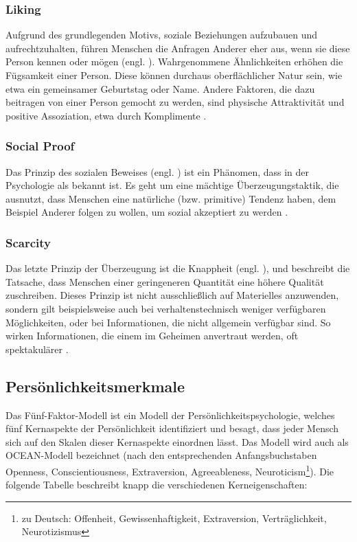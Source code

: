 \subsubsection{Liking}
Aufgrund des grundlegenden Motivs, soziale Beziehungen aufzubauen und aufrechtzuhalten, führen Menschen die Anfragen Anderer eher aus, wenn sie diese Person kennen oder mögen (engl. ).
Wahrgenommene Ähnlichkeiten erhöhen die Fügsamkeit einer Person. Diese können durchaus oberflächlicher Natur sein, wie etwa ein gemeinsamer Geburtstag oder Name.
Andere Faktoren, die dazu beitragen von einer Person gemocht zu werden, sind physische Attraktivität und positive Assoziation, etwa durch Komplimente .

\subsubsection{Social Proof}
Das Prinzip des sozialen Beweises (engl. ) ist ein Phänomen, dass in der Psychologie als  bekannt ist.
Es geht um eine mächtige Überzeugungstaktik, die ausnutzt, dass Menschen eine natürliche (bzw. primitive) Tendenz haben, dem Beispiel Anderer folgen zu wollen, um sozial akzeptiert zu werden .

\subsubsection{Scarcity}
Das letzte Prinzip der Überzeugung ist die Knappheit (engl. ), und beschreibt die Tatsache, dass Menschen einer geringeneren Quantität eine höhere Qualität zuschreiben.
Dieses Prinzip ist nicht ausschließlich auf Materielles anzuwenden, sondern gilt beispielsweise auch bei verhaltenstechnisch weniger verfügbaren Möglichkeiten, oder bei Informationen, die nicht allgemein verfügbar sind.
So wirken Informationen, die einem im Geheimen anvertraut werden, oft spektakulärer .

\subsection{Persönlichkeitsmerkmale}

Das Fünf-Faktor-Modell ist ein Modell der Persönlichkeitspsychologie, welches fünf Kernaspekte der Persönlichkeit identifiziert und besagt, dass jeder Mensch sich auf den Skalen dieser Kernaspekte einordnen lässt.
Das Modell wird auch als OCEAN-Modell bezeichnet (nach den entsprechenden Anfangsbuchstaben Openness, Conscientiousness, Extraversion, Agreeableness, Neuroticism\footnote{zu Deutsch: Offenheit, Gewissenhaftigkeit, Extraversion, Verträglichkeit, Neurotizismus}).
Die folgende Tabelle beschreibt knapp die verschiedenen Kerneigenschaften:

